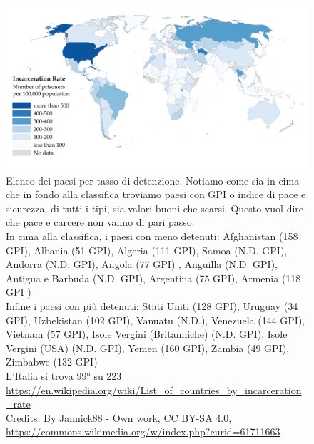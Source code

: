 \documentclass[12pt]{book} %
\begin{document}
\begin{figure}[H]
  \begin{minipage}{17cm}
    \includegraphics[width=17cm]{images/Libro-img037.png}
    \caption{Elenco dei paesi per tasso di detenzione. Notiamo come
sia in cima che in fondo alla classifica troviamo paesi con GPI o indice di pace e sicurezza, di tutti i tipi, sia
valori buoni che scarsi. Questo vuol dire che pace e carcere non vanno di pari passo.\\
In cima alla classifica, i paesi con meno detenuti: Afghanistan (158 GPI), Albania (51 GPI), Algeria (111 GPI), Samoa
(N.D. GPI), Andorra (N.D. GPI), Angola (77 GPI) , Anguilla (N.D. GPI), Antigua e Barbuda (N.D. GPI), Argentina (75
GPI), Armenia (118 GPI )\\
Infine i paesi con più detenuti: Stati Uniti (128 GPI), Uruguay (34 GPI), Uzbekistan (102 GPI), Vanuatu (N.D.),
Venezuela (144 GPI), Vietnam (57 GPI), Isole Vergini (Britanniche) (N.D. GPI), Isole Vergini (USA) (N.D. GPI), Yemen
(160 GPI), Zambia (49 GPI), Zimbabwe (132 GPI)\\
L'Italia si trova 99° su 223\\
\protect\url{https://en.wikipedia.org/wiki/List\_of\_countries\_by\_incarceration\_rate}\\
Credits: By Jannick88 - Own work, CC BY-SA 4.0, \protect\url{https://commons.wikimedia.org/w/index.php?curid=61711663} }
  \end{minipage}
\end{figure}
\end{document}
